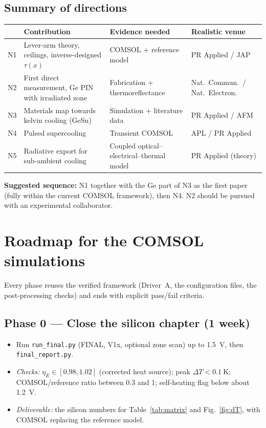\documentclass[11pt,a4paper]{article}
\begin{document}
\subsection{Summary of directions}
\begin{table}[h]
\centering\small
\begin{tabularx}{\textwidth}{lXll}
\toprule
 & Contribution & Evidence needed & Realistic venue\\
\midrule
N1 & Lever-arm theory, ceilings, inverse-designed $\tau(x)$ & COMSOL + reference model & PR Applied / JAP\\
N2 & First direct measurement, Ge PIN with irradiated zone & Fabrication + thermoreflectance & Nat.\ Commun.\ / Nat.\ Electron.\\
N3 & Materials map towards kelvin cooling (GeSn) & Simulation + literature data & PR Applied / AFM\\
N4 & Pulsed supercooling & Transient COMSOL & APL / PR Applied\\
N5 & Radiative export for sub-ambient cooling & Coupled optical--electrical--thermal model & PR Applied (theory)\\
\bottomrule
\end{tabularx}
\end{table}
\noindent\textbf{Suggested sequence:} N1 together with the Ge part of N3 as the first paper (fully within the current COMSOL framework), then N4. N2 should be pursued with an experimental collaborator.

\section{Roadmap for the COMSOL simulations}\label{sec:roadmap}
Every phase reuses the verified framework (Driver~A, the configuration files, the post-processing checks) and ends with explicit pass/fail criteria.

\subsection*{Phase 0 --- Close the silicon chapter (1 week)}
\begin{itemize}
  \item Run \texttt{run\_final.py} (FINAL, V1x, optional zone scan) up to \SI{1.5}{\volt}, then \texttt{final\_report.py}.
  \item \emph{Checks:} $\eta_E\in[0.98,1.02]$ (corrected heat source); peak $\Delta T<\SI{0.1}{\kelvin}$; COMSOL/reference ratio between 0.3 and 1; self-heating flag below about \SI{1.2}{\volt}.
  \item \emph{Deliverable:} the silicon numbers for Table~\ref{tab:matrix} and Fig.~\ref{fig:dT}, with COMSOL replacing the reference model.
\end{itemize}
\end{document}
